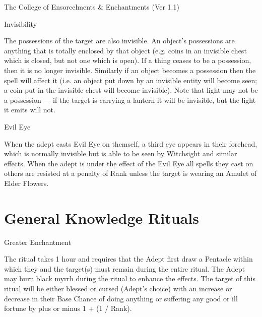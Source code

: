 \begin{Chapter}{The College of Ensorcelments \& Enchantments (Ver 1.1)}
\begin{spell}[G-8]{Invisibility}
\begin{effects}
The possessions of the target are also invisible. An object’s
possessions are anything that is totally enclosed by that object (e.g.
coins in an invisible chest which is closed, but not one which is
open).  If a thing ceases to be a possession, then it is no longer
invisible.  Similarly if an object becomes a possession then the spell
will affect it (i.e.  an object put down by an invisible entity will
become seen; a coin put in the invisible chest will become invisible).
Note that light may not be a possession — if the target is carrying a
lantern it will be invisible, but the light it emits will not.
\end{effects}
\end{spell}

\begin{spell}[G-9]{Evil Eye }

\begin{effects}
When the adept casts Evil Eye on themself, a third eye appears in
their forehead, which is normally invisible but is able to be seen by
Witchsight and similar effects.  When the adept is under the effect of
the Evil Eye all spells they cast on others are resisted at a penalty
of Rank unless the target is wearing an Amulet of Elder Flowers.
\end{effects}
\end{spell}

\section{General Knowledge Rituals}

\begin{ritual}[Q-1]{Greater Enchantment}

\begin{effects}
The ritual takes 1 hour and requires that the Adept first draw a
Pentacle within which they and the target(s) must remain during the
entire ritual. The Adept may burn black myrrh during the ritual to
enhance the effects.  The target of this ritual will be either blessed
or cursed (Adept’s choice) with an increase or decrease in their Base
Chance of doing anything or suffering any good or ill fortune by plus
or minus 1 + (1 / Rank).


\end{effects}
\end{ritual}
\end{Chapter}
